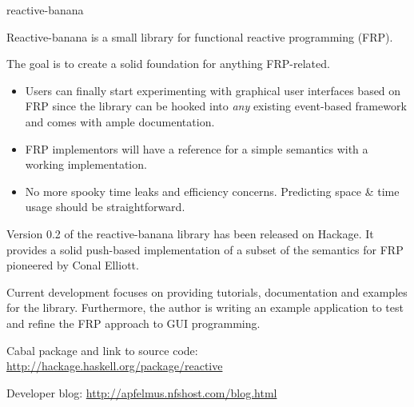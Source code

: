 %
%
% 
\begin{hcarentry}[new]{reactive-banana}
\makeheader

Reactive-banana is a small library for functional reactive programming (FRP).

The goal is to create a solid foundation for anything FRP-related.
\begin{itemize}
\item Users can finally start experimenting with graphical user interfaces based on FRP since the library can be hooked into \emph{any} existing event-based framework and comes with ample documentation.
\item FRP implementors will have a reference for a simple semantics with a working implementation.
\item No more spooky time leaks and efficiency concerns. Predicting space \& time usage should be straightforward.
\end{itemize}

Version 0.2 of the reactive-banana library has been released on Hackage. It provides a solid push-based implementation of a subset of the semantics for FRP pioneered by Conal Elliott.

Current development focuses on providing tutorials, documentation and examples for the library. Furthermore, the author is writing an example application to test and refine the FRP approach to GUI programming.

\FurtherReading
\begin{compactitem}
\item  Cabal package and link to source code:  \url{http://hackage.haskell.org/package/reactive}
\item  Developer blog:  \url{http://apfelmus.nfshost.com/blog.html}
\end{compactitem}
\end{hcarentry}

